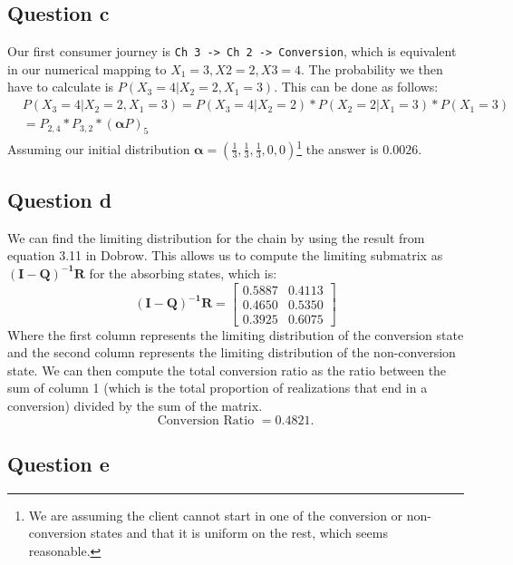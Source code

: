 \documentclass[11pt, a4paper]{article}
\begin{document}
\subsection{Question c}
Our first consumer journey is \verb|Ch 3 -> Ch 2 -> Conversion|, which is equivalent in our numerical mapping to $X_1 = 3, X2 = 2, X3 = 4$.
The probability we then have to calculate is $P(X_3 = 4|X_2=2, X_1 = 3)$. This can be done as follows:
\begin{align*}
	&P(X_3 = 4|X_2=2, X_1 = 3) = P(X_3 = 4 | X_2 = 2) * P(X_2 = 2 | X_1 = 3) * P(X_1 = 3) \\
	&= P_{2,4} * P_{3,2} * (\bm{\alpha}P)_5
\end{align*}
Assuming our initial distribution $\bm{\alpha} = (\frac{1}{3}, \frac{1}{3}, \frac{1}{3}, 0, 0)$\footnote{We are assuming the client cannot start in one of the conversion or non-conversion states and that it is uniform on the rest, which seems reasonable.} the answer is $0.0026$.

\subsection{Question d}
We can find the limiting distribution for the chain by using the result from equation 3.11 in Dobrow. This allows us to compute the limiting submatrix as $ \bm{(I-Q)^{-1}R}$ for the absorbing states, which is:
\[
	\bm{(I-Q)^{-1}R} = \begin{bmatrix}
		0.5887 & 0.4113 \\
		0.4650 & 0.5350 \\
		0.3925 & 0.6075
	\end{bmatrix}
\]
Where the first column represents the limiting distribution of the conversion state and the second column represents the limiting distribution of the non-conversion state. 
We can then compute the total conversion ratio as the ratio between the sum of column 1 (which is the total proportion of realizations that end in a conversion) divided by the sum of the matrix.
\[
	\text{Conversion Ratio }  = 0.4821.
\]

\subsection{Question e}
\end{document}
